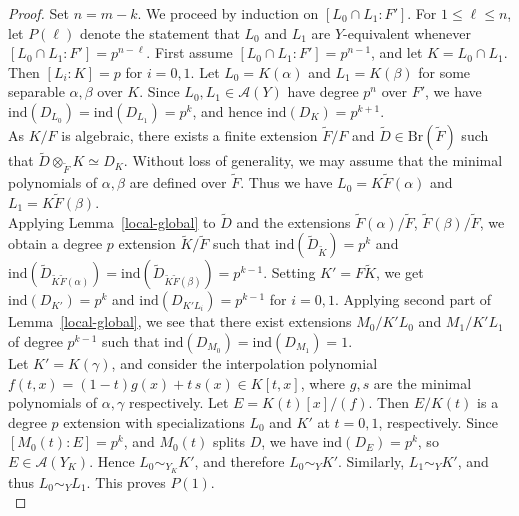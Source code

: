 \documentclass[10pt]{amsart}
\theoremstyle{plain}
\theoremstyle{definition}
\newcommand{\Br}{\text{Br}}
\begin{document}
\begin{proof}
Set \(n = m-k\). We proceed by induction on \([L_0 \cap L_1 : F']\). For \(1 \le \ell \le n\), let \(P(\ell)\) denote the statement that \(L_0\) and \(L_1\) are \(Y\)-equivalent whenever \([L_0 \cap L_1 : F'] = p^{n-\ell}\). First assume \([L_0 \cap L_1 : F'] = p^{n-1}\), and let \(K = L_0 \cap L_1\). Then \([L_i:K]=p\) for \(i=0,1\). Let \(L_0 = K(\alpha)\) and \(L_1 = K(\beta)\) for some separable \(\alpha,\beta\) over \(K\). Since \(L_0, L_1 \in \mathcal{A}(Y)\) have degree \(p^n\) over \(F'\), we have \(\mathrm{ind}(D_{L_0})=\mathrm{ind}(D_{L_1})=p^k\), and hence \(\mathrm{ind}(D_K)=p^{k+1}\). \\
As \(K/F\) is algebraic, there exists a finite extension \(\tilde{F}/F\) and \(\tilde{D} \in \Br(\tilde{F})\) such that \(\tilde{D} \otimes_{\tilde{F}} K \simeq D_K\). Without loss of generality, we may assume that the minimal polynomials of \(\alpha,\beta\) are defined over \(\tilde{F}\). Thus we have \(L_0 = K\tilde{F}(\alpha)\) and \(L_1 = K\tilde{F}(\beta)\). \\ Applying Lemma~\ref{local-global} to \(\tilde{D}\) and the extensions \(\tilde{F}(\alpha)/\tilde{F}\), \(\tilde{F}(\beta)/\tilde{F}\), we obtain a degree \(p\) extension \(\tilde{K}/\tilde{F}\) such that \(\mathrm{ind}(\tilde{D}_{\tilde{K}})=p^k\) and \(\mathrm{ind}(\tilde{D}_{\tilde{K}\tilde{F}(\alpha)})=\mathrm{ind}(\tilde{D}_{\tilde{K}\tilde{F}(\beta)})=p^{k-1}\). Setting \(K' = F\tilde{K}\), we get \(\mathrm{ind}(D_{K'})=p^k\) and \(\mathrm{ind}(D_{K' L_i})=p^{k-1}\) for \(i=0,1\). Applying second part of Lemma~\ref{local-global}, we see that there exist extensions \(M_0/K' L_0\) and \(M_1/K' L_1\) of degree \(p^{k-1}\) such that \(\mathrm{ind}(D_{M_0})=\mathrm{ind}(D_{M_1})=1\).\\
Let \(K'=K(\gamma)\), and consider the interpolation polynomial \(f(t,x)=(1-t)g(x)+t\,s(x)\in K[t,x]\), where \(g,s\) are the minimal polynomials of \(\alpha,\gamma\) respectively. Let \(E=K(t)[x]/(f)\). Then \(E/K(t)\) is a degree \(p\) extension with specializations \(L_0\) and \(K'\) at \(t=0,1\), respectively. Since \([M_0(t):E]=p^k\), and \(M_0(t)\) splits \(D\), we have \(\mathrm{ind}(D_E)=p^k\), so \(E \in \mathcal{A}(Y_K)\). Hence \(L_0 \sim_{Y_K} K'\), and therefore \(L_0 \sim_Y K'\). Similarly, \(L_1 \sim_Y K'\), and thus \(L_0 \sim_Y L_1\). This proves \(P(1)\).\\

\end{proof}
\end{document}

